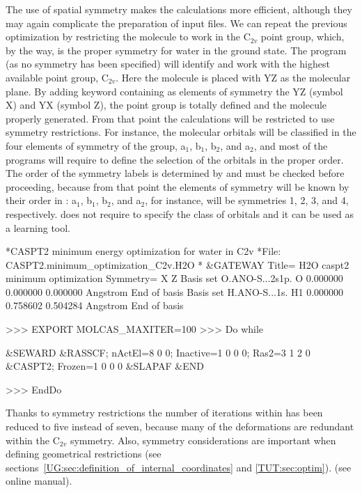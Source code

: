 The use of spatial symmetry makes the calculations more efficient, although
they may again complicate the preparation of input files. We can repeat the previous 
optimization by restricting the molecule to work in the C$_{2v}$ point group, which, by the way,
is the proper symmetry for water in the ground state. The  program (as no symmetry
has been specified) will identify and work with the highest available point group,
C$_{2v}$. Here the molecule is placed with YZ as the molecular plane. By adding
keyword  containing as elements of symmetry the YZ (symbol X) and YX (symbol Z),
the point group is totally defined and the molecule properly generated. From that point the
calculations will be restricted to use symmetry restrictions. For instance, the molecular
orbitals will be classified in the four elements of symmetry of the group, a$_1$, b$_1$, b$_2$,
and a$_2$, and most of the programs will require to define the selection of the orbitals in
the proper order. The order of the symmetry labels is determined by  and must
be checked before proceeding, because from that point the elements of symmetry will be known
by their order in : a$_1$, b$_1$, b$_2$, and a$_2$, for instance, will be
symmetries 1, 2, 3, and 4, respectively.  does not require to specify the
class of orbitals and it can be used as a learning tool.


\begin{inputlisting}
*CASPT2 minimum energy optimization for water in C2v
*File: CASPT2.minimum_optimization_C2v.H2O
*
 &GATEWAY
Title= H2O caspt2 minimum optimization
Symmetry= X Z
Basis set
O.ANO-S...2s1p.
O        0.000000  0.000000  0.000000 Angstrom
End of basis
Basis set
H.ANO-S...1s.
H1       0.000000  0.758602  0.504284 Angstrom
End of basis

>>> EXPORT MOLCAS_MAXITER=100
>>> Do while

 &SEWARD
 &RASSCF; nActEl=8 0 0; Inactive=1 0 0 0; Ras2=3 1 2 0
 &CASPT2; Frozen=1 0 0 0
 &SLAPAF &END

>>> EndDo
\end{inputlisting}

Thanks to symmetry restrictions the number of iterations within 
has been reduced to five instead of seven, because many of the deformations 
are redundant within the C$_{2v}$ symmetry. Also, symmetry considerations are 
important when defining geometrical restrictions 
\ifmanual
(see sections~\ref{UG:sec:definition_of_internal_coordinates}
and \ref{TUT:sec:optim}).
\else
(see online manual).
\fi

